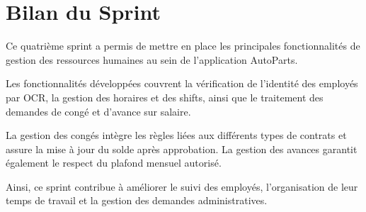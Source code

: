 

\section{Bilan du Sprint}

Ce quatrième sprint a permis de mettre en place les principales fonctionnalités de gestion des ressources humaines au sein de l'application AutoParts.

Les fonctionnalités développées couvrent la vérification de l'identité des employés par OCR, la gestion des horaires et des shifts, ainsi que le traitement des demandes de congé et d'avance sur salaire.

La gestion des congés intègre les règles liées aux différents types de contrats et assure la mise à jour du solde après approbation. La gestion des avances garantit également le respect du plafond mensuel autorisé.

Ainsi, ce sprint contribue à améliorer le suivi des employés, l'organisation de leur temps de travail et la gestion des demandes administratives.
